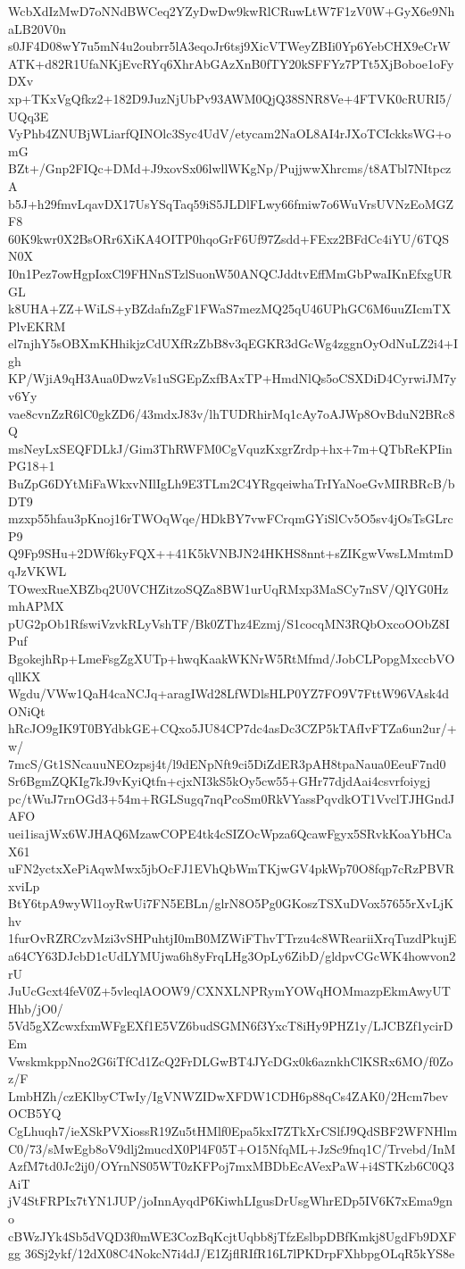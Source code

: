 WcbXdIzMwD7oNNdBWCeq2YZyDwDw9kwRlCRuwLtW7F1zV0W+GyX6e9NhaLB20V0n
s0JF4D08wY7u5mN4u2oubrr5lA3eqoJr6tsj9XicVTWeyZBIi0Yp6YebCHX9eCrW
ATK+d82R1UfaNKjEvcRYq6XhrAbGAzXnB0fTY20kSFFYz7PTt5XjBoboe1oFyDXv
xp+TKxVgQfkz2+182D9JuzNjUbPv93AWM0QjQ38SNR8Ve+4FTVK0cRURI5/UQq3E
VyPhb4ZNUBjWLiarfQINOlc3Syc4UdV/etycam2NaOL8AI4rJXoTCIckksWG+omG
BZt+/Gnp2FIQc+DMd+J9xovSx06lwllWKgNp/PujjwwXhrcms/t8ATbl7NItpczA
b5J+h29fmvLqavDX17UsYSqTaq59iS5JLDlFLwy66fmiw7o6WuVrsUVNzEoMGZF8
60K9kwr0X2BsORr6XiKA4OITP0hqoGrF6Uf97Zsdd+FExz2BFdCc4iYU/6TQSN0X
I0n1Pez7owHgpIoxCl9FHNnSTzlSuonW50ANQCJddtvEffMmGbPwaIKnEfxgURGL
k8UHA+ZZ+WiLS+yBZdafnZgF1FWaS7mezMQ25qU46UPhGC6M6uuZIcmTXPlvEKRM
el7njhY5sOBXmKHhikjzCdUXfRzZbB8v3qEGKR3dGcWg4zggnOyOdNuLZ2i4+Igh
KP/WjiA9qH3Aua0DwzVs1uSGEpZxfBAxTP+HmdNlQs5oCSXDiD4CyrwiJM7yv6Yy
vae8cvnZzR6lC0gkZD6/43mdxJ83v/lhTUDRhirMq1cAy7oAJWp8OvBduN2BRc8Q
msNeyLxSEQFDLkJ/Gim3ThRWFM0CgVquzKxgrZrdp+hx+7m+QTbReKPIinPG18+1
BuZpG6DYtMiFaWkxvNIlIgLh9E3TLm2C4YRgqeiwhaTrIYaNoeGvMIRBRcB/bDT9
mzxp55hfau3pKnoj16rTWOqWqe/HDkBY7vwFCrqmGYiSlCv5O5sv4jOsTsGLrcP9
Q9Fp9SHu+2DWf6kyFQX++41K5kVNBJN24HKHS8nnt+sZIKgwVwsLMmtmDqJzVKWL
TOwexRueXBZbq2U0VCHZitzoSQZa8BW1urUqRMxp3MaSCy7nSV/QlYG0HzmhAPMX
pUG2pOb1RfswiVzvkRLyVshTF/Bk0ZThz4Ezmj/S1cocqMN3RQbOxcoOObZ8IPuf
BgokejhRp+LmeFsgZgXUTp+hwqKaakWKNrW5RtMfmd/JobCLPopgMxccbVOqllKX
Wgdu/VWw1QaH4caNCJq+aragIWd28LfWDlsHLP0YZ7FO9V7FttW96VAsk4dONiQt
hRcJO9gIK9T0BYdbkGE+CQxo5JU84CP7dc4asDc3CZP5kTAfIvFTZa6un2ur/+w/
7mcS/Gt1SNcauuNEOzpsj4t/l9dENpNft9ci5DiZdER3pAH8tpaNaua0EeuF7nd0
Sr6BgmZQKIg7kJ9vKyiQtfn+cjxNI3kS5kOy5cw55+GHr77djdAai4csvrfoiygj
pc/tWuJ7rnOGd3+54m+RGLSugq7nqPcoSm0RkVYassPqvdkOT1VvclTJHGndJAFO
uei1isajWx6WJHAQ6MzawCOPE4tk4cSIZOcWpza6QcawFgyx5SRvkKoaYbHCaX61
uFN2yctxXePiAqwMwx5jbOcFJ1EVhQbWmTKjwGV4pkWp70O8fqp7cRzPBVRxviLp
BtY6tpA9wyWl1oyRwUi7FN5EBLn/glrN8O5Pg0GKoszTSXuDVox57655rXvLjKhv
1furOvRZRCzvMzi3vSHPuhtjI0mB0MZWiFThvTTrzu4c8WReariiXrqTuzdPkujE
a64CY63DJcbD1cUdLYMUjwa6h8yFrqLHg3OpLy6ZibD/gldpvCGcWK4howvon2rU
JuUcGcxt4feV0Z+5vleqlAOOW9/CXNXLNPRymYOWqHOMmazpEkmAwyUTHhb/jO0/
5Vd5gXZcwxfxmWFgEXf1E5VZ6budSGMN6f3YxcT8iHy9PHZ1y/LJCBZf1ycirDEm
VwskmkppNno2G6iTfCd1ZcQ2FrDLGwBT4JYcDGx0k6aznkhClKSRx6MO/f0Zoz/F
LmbHZh/czEKlbyCTwIy/IgVNWZIDwXFDW1CDH6p88qCs4ZAK0/2Hcm7bevOCB5YQ
CgLhuqh7/ieXSkPVXiossR19Zu5tHMlf0Epa5kxI7ZTkXrCSlfJ9QdSBF2WFNHlm
C0/73/sMwEgb8oV9dlj2mucdX0Pl4F05T+O15NfqML+JzSc9fnq1C/Trvebd/InM
AzfM7td0Jc2ij0/OYrnNS05WT0zKFPoj7mxMBDbEcAVexPaW+i4STKzb6C0Q3AiT
jV4StFRPIx7tYN1JUP/joInnAyqdP6KiwhLIgusDrUsgWhrEDp5IV6K7xEma9gno
cBWzJYk4Sb5dVQD3f0mWE3CozBqKcjtUqbb8jTfzEslbpDBfKmkj8UgdFb9DXFgg
36Sj2ykf/12dX08C4NokcN7i4dJ/E1ZjflRIfR16L7lPKDrpFXhbpgOLqR5kYS8e
